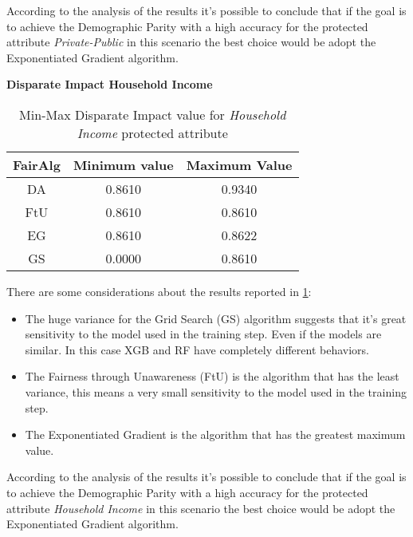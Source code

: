 According to the analysis of the results it's possible to conclude that if the goal is to achieve the Demographic Parity with a high accuracy for the protected attribute \emph{Private-Public} in this scenario the best choice would be adopt the Exponentiated Gradient algorithm.

\newpage
\textbf{Disparate Impact Household Income}
\begin{table}
    \centering
    \begin{tabular}{|c|c|c|}
        \hline
        \textbf{FairAlg} & \textbf{Minimum value} & \textbf{Maximum Value} \\
        \hline
        DA & 0.8610 & 0.9340 \\
        \hline
        FtU & 0.8610 & 0.8610 \\
        \hline
        EG & 0.8610 & 0.8622 \\
        \hline
        GS & 0.0000 & 0.8610 \\
        \hline
    \end{tabular}
    \caption{Min-Max Disparate Impact value for \emph{Household Income} protected attribute}
    \label{tab:h_di}
\end{table}

There are some considerations about the results reported in \cref{tab:h_di}:

\begin{itemize}

    \item The huge variance for the Grid Search (GS) algorithm suggests that it's great sensitivity to the model used in the training step. Even if the models are similar. In this case XGB and RF have completely different behaviors.

    \item The Fairness through Unawareness (FtU) is the algorithm that has the least variance, this means a very small sensitivity to the model used in the training step.

    \item The Exponentiated Gradient is the algorithm that has the greatest maximum value.

\end{itemize}

According to the analysis of the results it's possible to conclude that if the goal is to achieve the Demographic Parity with a high accuracy for the protected attribute \emph{Household Income} in this scenario the best choice would be adopt the Exponentiated Gradient algorithm.


